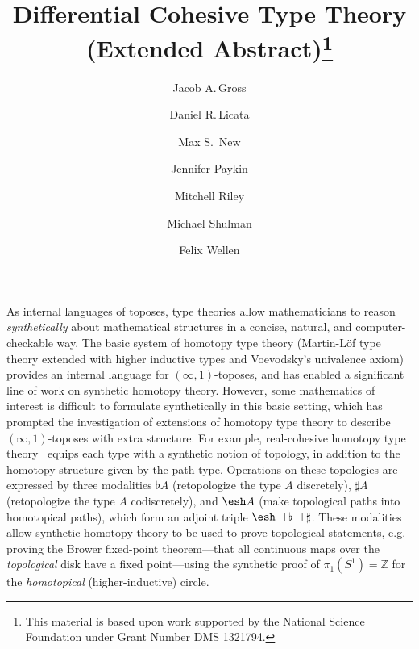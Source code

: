 \documentclass{article}
\title{Differential Cohesive Type Theory (Extended Abstract)\thanks{This
    material is based upon work supported by the National Science Foundation
    under Grant Number DMS 1321794.}}
\author{Jacob A.\,Gross}
\affil[1]{University of Pittsburgh}
\author[2]{Daniel R.\,Licata}
\affil[2]{Wesleyan University}
\author[3]{Max S.\, New}
\affil[3]{Northeastern University}
\author[4]{Jennifer Paykin}
\affil[4]{University of Pennsylvania}
\author[2]{Mitchell Riley}
\author[5]{Michael Shulman}
\affil[5]{University of San Diego}
\author[6]{Felix Wellen}
\affil[6]{Karlsruhe Institute of Technology}
\date{}
\begin{document}
\maketitle


As internal languages of toposes, type theories allow mathematicians to
reason \emph{synthetically} about mathematical structures in a concise,
natural, and computer-checkable way.  The basic system of homotopy type
theory (Martin-L\"of type theory extended with higher inductive types
and Voevodsky's univalence axiom) provides an internal language for
$(\infty,1)$-toposes, and has enabled a significant line of work on
synthetic homotopy theory.  However, some mathematics of interest is
difficult to formulate synthetically in this basic setting, which has
prompted the investigation of extensions of homotopy type theory to
describe $(\infty,1)$-toposes with extra structure.  For example,
real-cohesive homotopy type theory~\citep{Shulman2015} equips each type
with a synthetic notion of topology, in addition to the homotopy
structure given by the path type.  Operations on these topologies are
expressed by three modalities $\flat A$ (retopologize the type $A$
discretely), $\sharp A$ (retopologize the type $A$ codiscretely), and
$\shape A$ (make topological paths into homotopical paths), which form
an adjoint triple $\shape \dashv \flat \dashv \sharp$.  These modalities
allow synthetic homotopy theory to be used to prove topological
statements, e.g. proving the Brower fixed-point theorem---that all
continuous maps over the \emph{topological} disk have a fixed
point---using the synthetic proof of $\pi_1(S^1) = \mathbb{Z}$ for the
\emph{homotopical} (higher-inductive) circle.
\end{document}
